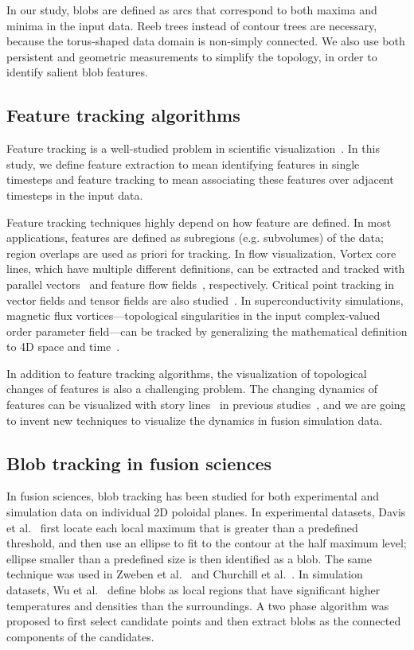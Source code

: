 In our study, blobs are defined as arcs that correspond to both maxima and minima in the input data.  Reeb trees instead of contour trees are necessary, because the torus-shaped data domain is non-simply connected.  We also use both persistent and geometric measurements to simplify the topology, in order to identify salient blob features.  


\subsection{Feature tracking algorithms}

Feature tracking is a well-studied problem in scientific visualization~\cite{PostVHLD2003}.  In this study, we define feature extraction to mean identifying features in single timesteps and feature tracking to mean associating these features over adjacent timesteps in the input data.  

Feature tracking techniques highly depend on how feature are defined.  In most applications, features are defined as subregions (e.g. subvolumes) of the data; region overlaps are used as priori for tracking.  In flow visualization, Vortex core lines, which have multiple different definitions, can be extracted and tracked with parallel vectors~\cite{PeikertR99} and feature flow fields~\cite{TheiselS03, WeinkaufTGP11}, respectively.  Critical point tracking in vector fields and tensor fields are also studied~\cite{GarthTS04, TricocheSH01, TricocheWSH02, ReininghausKWH12}.  In superconductivity simulations, magnetic flux vortices---topological singularities in the input complex-valued order parameter field---can be tracked by generalizing the mathematical definition to 4D space and time~\cite{GuoPPKG16, GuoPG17, PhillipsGPKG16, PhillipsPKG15}.  

In addition to feature tracking algorithms, the visualization of topological changes of features is also a challenging problem.  The changing dynamics of features can be visualized with story lines~\cite{TanahashiM12} in previous studies~\cite{GuoPPKG16}, and we are going to invent new techniques to visualize the dynamics in fusion simulation data.  


\subsection{Blob tracking in fusion sciences}

In fusion sciences, blob tracking has been studied for both experimental and simulation data on individual 2D poloidal planes.  In experimental datasets, Davis et al.~\cite{DavisKMRSZ14} first locate each local maximum that is greater than a predefined threshold, and then use an ellipse to fit to the contour at the half maximum level; ellipse smaller than a predefined size is then identified as a blob.  The same technique was used in Zweben et al.~\cite{Zweben15} and Churchill et al.~\cite{Churchill17}.  In simulation datasets, Wu et al.~\cite{WuWSCCSCK16} define blobs as local regions that have significant higher temperatures and densities than the surroundings.  A two phase algorithm was proposed to first select candidate points and then extract blobs as the connected components of the candidates.  

